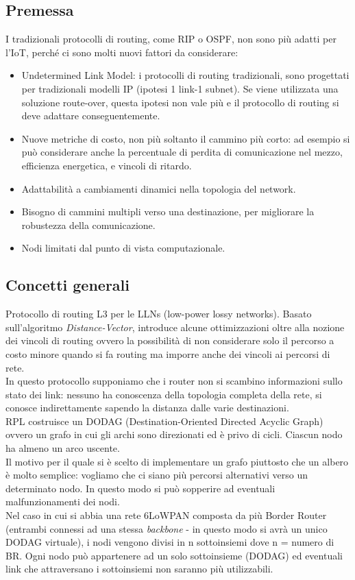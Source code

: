 \documentclass{article}
\begin{document}
\subsection{Premessa}
I tradizionali protocolli di routing, come RIP o OSPF, non sono più adatti per l'IoT, perché ci sono molti nuovi fattori da considerare:
\begin{itemize}
    \item Undetermined Link Model: i protocolli di routing tradizionali, sono progettati per tradizionali modelli IP (ipotesi 1 link-1 subnet). Se viene utilizzata una soluzione route-over, questa ipotesi non vale più e il protocollo di routing si deve adattare conseguentemente.
    \item Nuove metriche di costo, non più soltanto il cammino più corto: ad esempio si può considerare anche la percentuale di perdita di comunicazione nel mezzo, efficienza energetica, e vincoli di ritardo.
    \item Adattabilità a cambiamenti dinamici nella topologia del network.
    \item Bisogno di cammini multipli verso una destinazione, per migliorare la robustezza della comunicazione.
    \item Nodi limitati dal punto di vista computazionale.
\end{itemize}
\subsection{Concetti generali}
Protocollo di routing L3 per le LLNs (low-power lossy networks). Basato sull'algoritmo \textit{Distance-Vector}, introduce alcune ottimizzazioni oltre alla nozione dei vincoli di routing ovvero la possibilità di non considerare solo il percorso a costo minore quando si fa routing ma imporre anche dei vincoli ai percorsi di rete. \\
In questo protocollo supponiamo che i router non si scambino informazioni sullo stato dei link: nessuno ha conoscenza della topologia completa della rete, si conosce indirettamente sapendo la distanza dalle varie destinazioni. \\
RPL costruisce un DODAG (Destination-Oriented Directed Acyclic Graph) ovvero un grafo in cui gli archi sono direzionati ed è privo di cicli. Ciascun nodo ha almeno un arco uscente. \\
Il motivo per il quale si è scelto di implementare un grafo piuttosto che un albero è molto semplice: vogliamo che ci siano più percorsi alternativi verso un determinato nodo. In questo modo si può sopperire ad eventuali malfunzionamenti dei nodi. \\
Nel caso in cui si abbia una rete 6LoWPAN composta da più Border Router (entrambi connessi ad una stessa \textit{backbone} - in questo modo si avrà un unico DODAG virtuale), i nodi vengono divisi in n sottoinsiemi dove n = numero di BR. Ogni nodo può appartenere ad un solo sottoinsieme (DODAG) ed eventuali link che attraversano i sottoinsiemi non saranno più utilizzabili.
\end{document}

